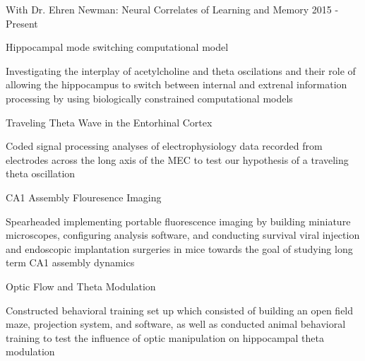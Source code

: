 \begin{cventries}

  
\cvrpentry
    {With Dr. Ehren Newman: Neural Correlates of Learning and Memory} %
    {} %
    {} %
    {2015 - Present } %
    {
      \begin{cvrpitems} %
        \item {Hippocampal mode switching computational model}
           \begin{cvitemsdes} 
	     \item{Investigating the interplay of acetylcholine and theta oscilations and their role of allowing the hippocampus to switch between internal and extrenal information processing by using biologically constrained computational models}
           \end{cvitemsdes} 
	\item{Traveling Theta Wave in the Entorhinal Cortex}
            \begin{cvitemsdes} 
	     \item{Coded signal processing analyses of electrophysiology data recorded from electrodes across the long axis of the MEC to test our hypothesis of a traveling theta oscillation}
           \end{cvitemsdes} 
	\item{CA1 Assembly Flouresence Imaging}
            \begin{cvitemsdes} 
	     \item{Spearheaded implementing portable fluorescence imaging by building miniature microscopes, configuring analysis software, and conducting survival viral injection and endoscopic implantation surgeries in mice towards the goal of studying long term CA1 assembly dynamics}
           \end{cvitemsdes} 
	\item{Optic Flow and Theta Modulation}
            \begin{cvitemsdes} 
	     \item{Constructed behavioral training set up which consisted of building an open field maze, projection system, and software, as well as conducted animal behavioral training to test the influence of optic manipulation on hippocampal theta modulation}
           \end{cvitemsdes} 
      \end{cvrpitems}
    }


\end{cventries}
